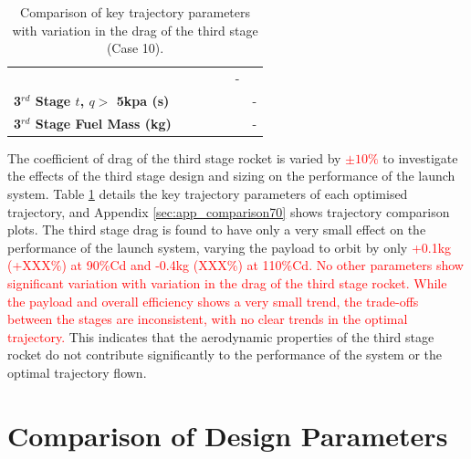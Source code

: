 \begin{table}[ht]
\begin{tabular}{l c c c c c c}
			& \textbf{\thirddExergyEffCdThreeNinetyFiveNoReturn}
			& \textbf{\thirddExergyEffCdThreeStandardNoReturn}
			& \textbf{\thirddExergyEffCdThreeOneOneHundredFiveNoReturn}
			& \textbf{\thirddExergyEffCdThreeOneHundredTenNoReturn}
			& -
			\\
			\textbf{3$^{rd}$ Stage $t$, $q >$ 5kpa (s)}
			& \thirdqOverFiveCdThreeNinetyNoReturn
			& \thirdqOverFiveCdThreeNinetyFiveNoReturn
			& \thirdqOverFiveCdThreeStandardNoReturn
			& \thirdqOverFiveCdThreeOneOneHundredFiveNoReturn
			& \thirdqOverFiveCdThreeOneHundredTenNoReturn
			& -
			\\
			\textbf{3$^{rd}$ Stage Fuel Mass (kg)}
			& \thirdmFuelCdThreeNinetyNoReturn
			& \thirdmFuelCdThreeNinetyFiveNoReturn
			& \thirdmFuelCdThreeStandardNoReturn
			& \thirdmFuelCdThreeOneOneHundredFiveNoReturn
			& \thirdmFuelCdThreeOneHundredTenNoReturn
			& -
			\\
			\hline 
		\end{tabular} 
	\caption{Comparison of key trajectory parameters with variation in the drag of the third stage (Case 10).}
	\label{tab:comparison70}
	
\end{table}

The coefficient of drag of the third stage rocket is varied by \textcolor{red}{$\pm10\%$} to investigate the effects of the third stage design and sizing on the performance of the launch system. Table \ref{tab:comparison70} details the key trajectory parameters of each optimised trajectory, and Appendix \ref{sec:app_comparison70} shows trajectory comparison plots. The third stage drag is found to have only a very small effect on the performance of the launch system, varying the payload to orbit by only \textcolor{red}{+0.1kg (+XXX\%) at 90\%Cd and -0.4kg (XXX\%) at 110\%Cd. No other parameters show significant variation with variation in the drag of the third stage rocket. While the payload and overall efficiency shows a very small trend, the trade-offs between the stages are inconsistent, with no clear trends in the optimal trajectory.} This indicates that the aerodynamic properties of the third stage rocket do not contribute significantly to the performance of the system or the optimal trajectory flown. 



\section{Comparison of Design Parameters}\label{sec:comparisonNoReturn}

